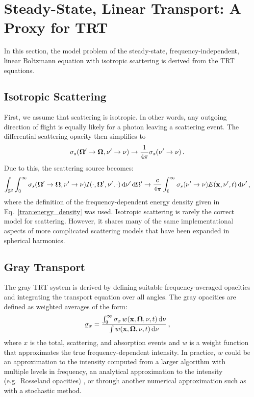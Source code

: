 \documentclass[../doc.tex]{subfiles}
\begin{document}
\section{Steady-State, Linear Transport: A Proxy for TRT}
In this section, the model problem of the steady-state, frequency-independent, linear Boltzmann equation with isotropic scattering is derived from the TRT equations. 

\subsection{Isotropic Scattering}
First, we assume that scattering is isotropic. In other words, any outgoing direction of flight is equally likely for a photon leaving a scattering event. The differential scattering opacity then simplifies to 
	\begin{equation}
		\sigma_s(\boldsymbol{\Omega}'\rightarrow\boldsymbol{\Omega},\nu'\rightarrow\nu) \rightarrow \frac{1}{4\pi}\sigma_s(\nu'\rightarrow \nu) \,. 
	\end{equation}
Due to this, the scattering source becomes: 
	\begin{equation}
		\int_{\mathbb{S}^2} \int_0^\infty \sigma_s(\boldsymbol{\Omega}'\rightarrow\boldsymbol{\Omega},\nu'\rightarrow \nu) I(\cdot,\boldsymbol{\Omega}',\nu',\cdot) \mathop{}\!\mathrm{d} \nu'\mathop{}\!\mathrm{d}\Omega' \rightarrow \frac{c}{4\pi} \int_0^\infty \sigma_s(\nu'\rightarrow\nu) E(\boldsymbol{\mathrm{x}},\nu',t) \mathop{}\!\mathrm{d} \nu' \,, 
	\end{equation}
where the definition of the frequency-dependent energy density given in Eq.~\ref{tran:energy_density} was used. Isotropic scattering is rarely the correct model for scattering. However, it shares many of the same implementational aspects of more complicated scattering models that have been expanded in spherical harmonics. 

\subsection{Gray Transport}
The gray TRT system is derived by defining suitable frequency-averaged opacities and integrating the transport equation over all angles. The gray opacities are defined as weighted averages of the form: 
	\begin{equation}
		\ubar{\sigma}_x = \frac{\int_0^\infty \sigma_x\,w(\x,\Omegahat,\nu,t) \ud \nu}{\int w(\x,\Omegahat,\nu,t) \ud \nu} \,, 
	\end{equation}
where $x$ is the total, scattering, and absorption events and $w$ is a weight function that approximates the true frequency-dependent intensity. In practice, $w$ could be an approximation to the intensity computed from a larger algorithm with multiple levels in frequency, an analytical approximation to the intensity (e.g.~Rosseland opacities) \cite{pomraning2005equations}, or through another numerical approximation such as with a stochastic method. 
\end{document}
